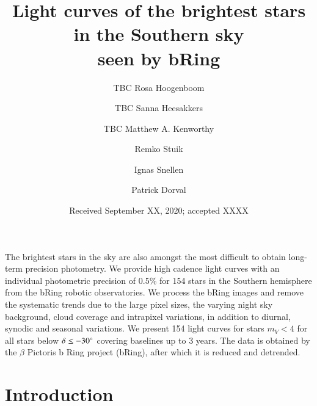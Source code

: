 \documentclass[onecolumn]{aa} %
\begin{document}
 

   \title{Light curves of the brightest stars in the Southern sky\\ seen by bRing}

   \author{TBC Rosa Hoogenboom
          \and
          TBC Sanna Heesakkers
          \and
          TBC Matthew A. Kenworthy
          \and
          Remko Stuik
          \and
          Ignas Snellen
          \and
          Patrick Dorval
          }


   \date{Received September XX, 2020; accepted XXXX}

 
  \abstract
   {The brightest stars in the sky are also amongst the most difficult to obtain long-term precision photometry. }
   {We provide high cadence light curves with an individual photometric precision of 0.5\% for 154 stars in the Southern hemisphere from the bRing robotic observatories.}
   {We process the bRing images and remove the systematic trends due to the large pixel sizes, the varying night sky background, cloud coverage and intrapixel variations, in addition to diurnal, synodic and seasonal variations.}
   {We present 154 light curves for stars $m_V<4$ for all stars below $\delta \leq -30^\circ $ covering baselines up to 3 years. The data is obtained by the $\beta$ Pictoris b Ring project (bRing), after which it is reduced and detrended.}
   {}


   \maketitle
%

\section{Introduction}
\end{document}
